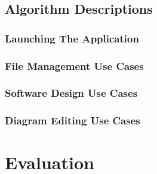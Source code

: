 \documentclass[a4paper]{article}
\begin{document}
	\subsection{Algorithm Descriptions}
		\subsubsection{Launching The Application}
			
		\subsubsection{File Management Use Cases}
		\subsubsection{Software Design Use Cases}
		\subsubsection{Diagram Editing Use Cases}
	 
\section{Evaluation}
\end{document}
